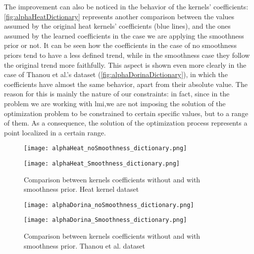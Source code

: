 The improvement can also be noticed in the behavior of the kernels' coefficients: \autoref{fig:alphaHeatDictionary} represents another comparison between the values assumed by the original heat kernels' coefficients (blue lines), and the ones assumed by the learned coefficients in the case we are applying the smoothness prior or not. It can be seen how the coefficients in the case of no smoothness priors tend to have a less defined trend, while in the smoothness case they follow the original trend more faithfully. This aspect is shown even more clearly in the case of Thanou et al.'s dataset (\autoref{fig:alphaDorinaDictionary}), in which the coefficients have almost the same behavior, apart from their absolute value. The reason for this is mainly the nature of our constraints: in fact, since in the problem we are working with \gls{lmi},we are not imposing the solution of the optimization problem to be constrained to certain specific values, but to a range of them. As a consequence, the solution of the optimization process represents a point localized in a certain range.

\begin{figure}
  \centering
  \begin{minipage}[c]{.85\textwidth}
    \centering
    \texttt{[image: alphaHeat\_noSmoothness\_dictionary.png]}
  \end{minipage}
  \vspace{10mm}
  \begin{minipage}[c]{.85\textwidth}
    \centering
    \texttt{[image: alphaHeat\_Smoothness\_dictionary.png]}
  \end{minipage}
  \caption{Comparison between kernels coefficients without and with smoothness prior. Heat kernel   dataset}
  \label{fig:alphaHeatDictionary}
\end{figure}

\begin{figure}
  \centering
  \begin{minipage}[c]{.85\textwidth}
    \centering
    \texttt{[image: alphaDorina\_noSmoothness\_dictionary.png]}
  \end{minipage}
  \vspace{10mm}
  \begin{minipage}[c]{.85\textwidth}
    \centering
    \texttt{[image: alphaDorina\_Smoothness\_dictionary.png]}
  \end{minipage}
  \caption{Comparison between kernels coefficients without and with smoothness prior. Thanou et al. dataset}
  \label{fig:alphaDorinaDictionary}
\end{figure}


